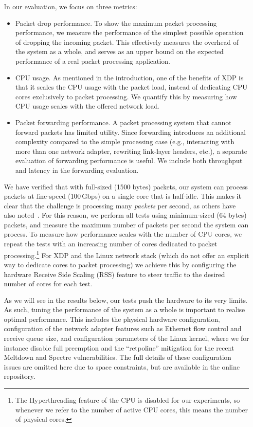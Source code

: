 \documentclass[sigconf]{acmart}
\begin{document}
In our evaluation, we focus on three metrics:

\begin{itemize}
\item Packet drop performance. To show the maximum packet processing
  performance, we measure the performance of the simplest possible operation of
  dropping the incoming packet. This effectively measures the overhead of the
  system as a whole, and serves as an upper bound on the expected performance of
  a real packet processing application.

\item CPU usage. As mentioned in the introduction, one of the benefits of XDP is
  that it scales the CPU usage with the packet load, instead of dedicating CPU
  cores exclusively to packet processing. We quantify this by measuring how CPU
  usage scales with the offered network load.

\item Packet forwarding performance. A packet processing system that cannot
  forward packets has limited utility. Since forwarding introduces an additional
  complexity compared to the simple processing case (e.g., interacting with more
  than one network adapter, rewriting link-layer headers, etc.), a separate
  evaluation of forwarding performance is useful. We include both throughput and
  latency in the forwarding evaluation.
\end{itemize}

We have verified that with full-sized (1500 bytes) packets, our system can
process packets at line-speed (100\,Gbps) on a single core that is half-idle.
This makes it clear that the challenge is processing many \emph{packets} per
second, as others have also noted~\cite{rizzo2012netmap}. For this reason, we
perform all tests using minimum-sized (64 bytes) packets, and measure the
maximum number of packets per second the system can process. To measure how
performance scales with the number of CPU cores, we repeat the tests with an
increasing number of cores dedicated to packet processing.\footnote{The
  Hyperthreading feature of the CPU is disabled for our experiments, so whenever
  we refer to the number of active CPU cores, this means the number of physical
  cores.} For XDP and the Linux network stack (which do not offer an explicit
way to dedicate cores to packet processing) we achieve this by configuring the
hardware Receive Side Scaling (RSS) feature to steer traffic to the desired
number of cores for each test.

As we will see in the results below, our tests push the hardware to its very
limits. As such, tuning the performance of the system as a whole is important to
realise optimal performance. This includes the physical hardware configuration,
configuration of the network adapter features such as Ethernet flow control and
receive queue size, and configuration parameters of the Linux kernel, where we
for instance disable full preemption and the ``retpoline'' mitigation for the
recent Meltdown and Spectre vulnerabilities. The full details of these
configuration issues are omitted here due to space constraints, but are
available in the online repository.
\end{document}
